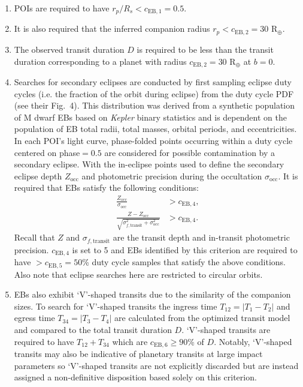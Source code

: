 \begin{enumerate}
\item POIs are required to have $r_p/R_s < c_{\text{EB},1}=0.5$.
\item It is also required that the inferred companion radius $r_p < c_{\text{EB},2}=30$
  R$_{\oplus}$.
\item The observed transit duration $D$ is required to be less than the transit
  duration corresponding to a planet with radius $c_{\text{EB},2}=30$ R$_{\oplus}$ at $b=0$.
\item Searches for secondary eclipses are conducted by first sampling eclipse duty cycles (i.e. the fraction of the
  orbit during eclipse) from the \cite{shan15} duty cycle PDF (see their Fig.~4). This distribution was
  derived from a synthetic population of M dwarf EBs based on \emph{Kepler} binary statistics and is
  dependent on the population of EB total radii, total masses, orbital periods, and eccentricities. In
  each POI's light curve, phase-folded points occurring within a duty cycle centered on
  phase$=0.5$ are considered for possible contamination by a secondary eclipse.
  With the in-eclipse points used to define the secondary eclipse depth $Z_{\text{occ}}$ and 
  photometric precision during the occultation $\sigma_{\text{occ}}$. It is required that EBs
  satisfy the following conditions:
  \begin{align}
    \frac{Z_{\text{occ}}}{\sigma_{\text{occ}}} &>c_{\text{EB},4}, \\
    \frac{Z-Z_{\text{occ}}}{\sqrt{\sigma_{f,\text{transit}}^2+\sigma_{\text{occ}}^2}} &>c_{\text{EB},4}.
    \label{eq:occ}
  \end{align}
  \noindent Recall that $Z$ and $\sigma_{f,\text{transit}}$ are the transit depth and in-transit photometric
  precision. $c_{\text{EB},4}$ is set to 5 \citep{gunther17} and EBs identified by this criterion are required
  to have $>c_{\text{EB},5}=50$\% duty cycle samples that satisfy the above conditions. Also note that
    eclipse searches here are restricted to circular orbits.
\item EBs also exhibit `V'-shaped transits due to the similarity of the companion sizes. To search for
  `V'-shaped transits the ingress time $T_{12}=|T_1-T_2|$ and egress time
  $T_{34}=|T_3-T_4|$ are calculated from the
  optimized transit model and compared to the total transit duration $D$. 
  `V'-shaped transits are required to have $T_{12}+T_{34}$ which are $c_{\text{EB},6}\geq 90$\% of $D$.
  Notably, `V'-shaped transits may also be indicative of planetary transits at large impact parameters
  so `V'-shaped transits are not explicitly discarded but are instead assigned a
  non-definitive disposition based solely on this criterion.
\end{enumerate}


